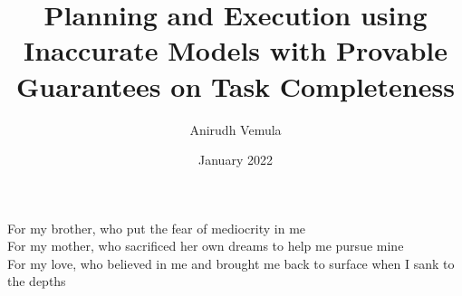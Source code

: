 \documentclass[11pt]{cmuthesis}
\begin{document}
\frontmatter

\pagestyle{empty}

\title{{\bf Planning and Execution using Inaccurate Models with
    Provable Guarantees on Task Completeness}}
\author{Anirudh Vemula}
\date{January 2022}


\support{}
\disclaimer{}


\maketitle

\begin{dedication}
  For my brother, who put the fear of mediocrity in me \\
  For my mother, who sacrificed her own dreams to help me pursue
  mine \\
  For my love, who believed in me and brought me back to surface
  when I sank to the depths
\end{dedication}
\end{document}
